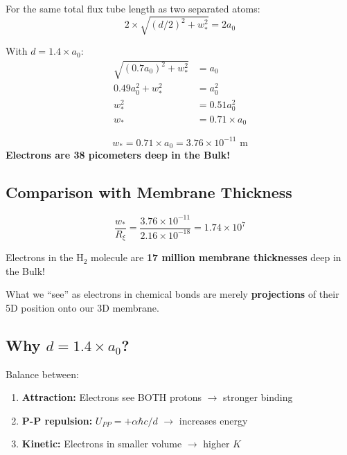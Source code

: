 \documentclass[12pt,a4paper]{article}
\begin{document}
For the same total flux tube length as two separated atoms:
\begin{equation}
2 \times \sqrt{(d/2)^2 + w_*^2} = 2 a_0
\end{equation}

With $d = 1.4 \times a_0$:
\begin{align}
\sqrt{(0.7 a_0)^2 + w_*^2} &= a_0 \\
0.49 a_0^2 + w_*^2 &= a_0^2 \\
w_*^2 &= 0.51 a_0^2 \\
w_* &= 0.71 \times a_0
\end{align}

\begin{keyresult}
\begin{equation}
\boxed{w_* = 0.71 \times a_0 = 3.76 \times 10^{-11} \text{ m}}
\end{equation}
\textbf{Electrons are 38 picometers deep in the Bulk!}
\end{keyresult}

\subsection{Comparison with Membrane Thickness}

\begin{equation}
\frac{w_*}{R_\xi} = \frac{3.76 \times 10^{-11}}{2.16 \times 10^{-18}} = 1.74 \times 10^{7}
\end{equation}

\begin{physicalinsight}
Electrons in the H$_2$ molecule are \textbf{17 million membrane thicknesses} deep in the Bulk!

What we ``see'' as electrons in chemical bonds are merely \textbf{projections} 
of their 5D position onto our 3D membrane.
\end{physicalinsight}

\subsection{Why $d = 1.4 \times a_0$?}

Balance between:
\begin{enumerate}
    \item \textbf{Attraction:} Electrons see BOTH protons $\to$ stronger binding
    \item \textbf{P-P repulsion:} $U_{PP} = +\alpha\hbar c/d$ $\to$ increases energy
    \item \textbf{Kinetic:} Electrons in smaller volume $\to$ higher $K$
\end{enumerate}
\end{document}
